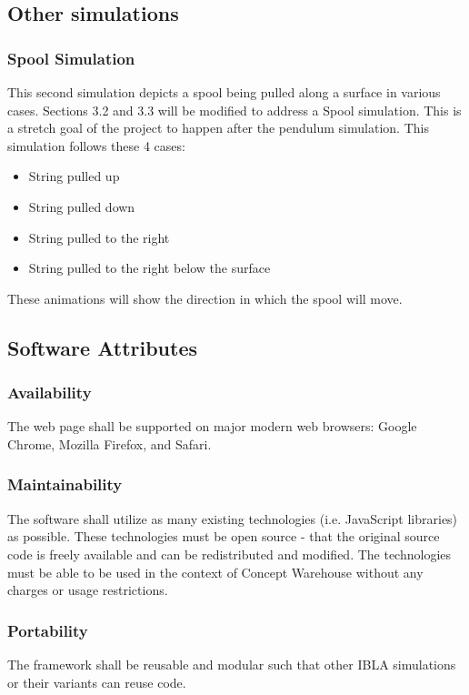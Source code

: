 \documentclass[onecolumn, draftclsnofoot,10pt, compsoc]{IEEEtran}
\begin{document}
\subsection{Other simulations}
\subsubsection{Spool Simulation}
This second simulation depicts a spool being pulled along a surface in various cases. Sections 3.2 and 3.3 will be modified to address a Spool simulation. This is a stretch goal of the project to happen after the pendulum simulation. This simulation follows these 4 cases:
\begin{itemize}
    \item String pulled up
    \item String pulled down
    \item String pulled to the right
    \item String pulled to the right below the surface
\end{itemize}
These animations will show the direction in which the spool will move. 

\subsection{Software Attributes}
\subsubsection{Availability}
The web page shall be supported on major modern web browsers: Google Chrome, Mozilla Firefox, and Safari.
\subsubsection{Maintainability}
The software shall utilize as many existing technologies (i.e. JavaScript libraries) as possible. These technologies must be open source - that the original source code is freely available and can be redistributed and modified. The technologies must be able to be used in the context of Concept Warehouse without any charges or usage restrictions.
\subsubsection{Portability}
The framework shall be reusable and modular such that other IBLA simulations or their variants can reuse code.
\end{document}

